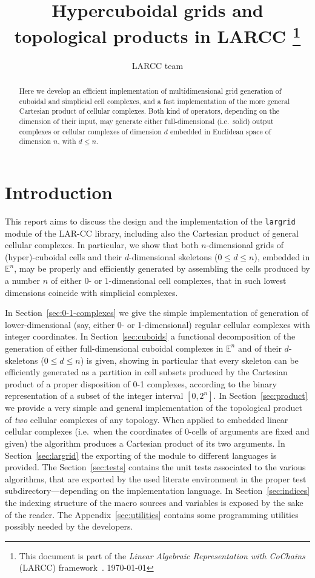 \documentclass[11pt,oneside]{article}	%
\title{Hypercuboidal grids and topological products in LARCC
\footnote{This document is part of the \emph{Linear Algebraic Representation with CoChains} (LARCC) framework~\cite{cclar-proj:2013:00}. \today}
}
\author{LARCC team}
\def\E{\mathbb{E}}
\begin{document}
\maketitle
\nonstopmode

\begin{abstract}
Here we develop an efficient implementation of multidimensional grid generation of cuboidal and simplicial cell complexes, and a fast implementation of the more general Cartesian product of cellular complexes. Both kind of operators, depending on the dimension of their input, may generate either full-dimensional (i.e.~solid) output complexes or cellular complexes of dimension $d$ embedded in Euclidean space of dimension $n$, with $d\leq n$. 
\end{abstract}

\tableofcontents
\newpage

\section{Introduction}

This report aims to discuss the design and the implementation of the \texttt{largrid} module of the LAR-CC library, including also the Cartesian product of general cellular complexes. 
In particular, we show that both $n$-dimensional grids of (hyper)-cuboidal cells and their  $d$-dimensional skeletons ($0\leq d\leq n$), embedded in $\E^n$, may be properly and efficiently generated by assembling the cells produced by a number $n$ of either $0$- or $1$-dimensional cell complexes, that in such lowest dimensions coincide with simplicial complexes. 

In Section~\ref{sec:0-1-complexes} we give the simple implementation of generation of lower-dimensional (say, either 0- or 1-dimensional) regular cellular complexes with integer coordinates.
In Section~\ref{sec:cuboids} a functional decomposition of the generation of either full-dimensional cuboidal complexes in $\E^n$ and of their $d$-skeletons ($0\leq d\leq n$) is given, showing in particular that every skeleton can be efficiently generated as a partition in cell subsets produced by the Cartesian product of a proper disposition of 0-1 complexes, according to the binary representation of a subset of the integer interval $[0,2^n]$.
In Section~\ref{sec:product} we provide a very simple and general implementation of the topological product of \emph{two} cellular complexes of any topology. When applied to embedded linear cellular complexes (i.e.~when the coordinates of 0-cells of arguments are fixed and given) the algorithm produces a Cartesian product of its two arguments.
In Section~\ref{sec:largrid} the exporting of the module to different languages is provided.
The Section~\ref{sec:tests} contains the unit tests associated to the various algorithms, that are exported by the used literate environment in the proper test subdirectory---depending on the implementation language.
In Section~\ref{sec:indices} the indexing structure of the macro sources and variables is exposed by the sake of the reader. 
The Appendix~\ref{sec:utilities} contains some programming utilities possibly needed by the developers.
\end{document}
